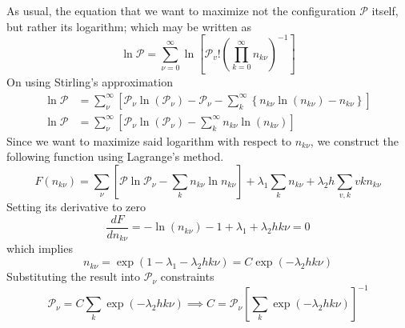 \documentclass[../../../Main.tex]{subfiles}
\begin{document}
As usual, the equation that we want to maximize not the configuration $\mathcal{P}$ itself, but rather its logarithm; which may be written as 
\begin{equation*}
    \ln \mathcal{P}=\sum_{\nu=0}^{\infty}\ln\left[\mathcal{P}_v!\left( \prod_{k=0}^{\infty} n_{k\nu}\right)^{-1}\right]
\end{equation*}
On using Stirling's approximation
\begin{align*}
    \ln \mathcal{P}&=\sum_\nu^\infty\left[\mathcal{P}_\nu\ln \left(\mathcal{P}_\nu\right)-\mathcal{P}_\nu - \sum_{k}^{\infty}\left\{n_{k\nu}\ln \left(n_{k\nu} \right)-n_{k\nu} \right\}\right]\\
    \ln \mathcal{P}&=\sum_\nu^\infty\left[\mathcal{P}_\nu\ln \left(\mathcal{P}_\nu\right) - \sum_{k}^{\infty}n_{k\nu}\ln \left(n_{k\nu} \right)\right]
\end{align*}
Since we want to maximize said logarithm with respect to $n_{k\nu}$, we construct the following function using Lagrange's method.
\begin{equation*}
    F(n_{k\nu})=\sum_\nu \left[\mathcal{P}\ln \mathcal{P}_\nu - \sum_{k} n_{k\nu}\ln n_{k\nu} \right]+ 
    \lambda_1\sum_{k}n_{k\nu}+
    \lambda_2h\sum_{v,k}vkn_{k\nu}
\end{equation*}
Setting its derivative to zero
\begin{equation*}
    \frac{dF}{dn_{k\nu}}=-\ln(n_{k\nu})-1+\lambda_1+\lambda_2hk\nu=0
\end{equation*}
which implies
\begin{equation*}
    n_{k\nu}=\exp\left(1-\lambda_1-\lambda_2hk\nu\right)=C\exp\left(-\lambda_2hk\nu\right)
\end{equation*}
Substituting the result into $\mathcal{P}_\nu$ constraints
\begin{equation*}
    \mathcal{P}_\nu=C\sum_{k } \exp\left(-\lambda_2hk\nu\right) \implies C=\mathcal{P}_\nu\left[\sum_{k } \exp\left(-\lambda_2hk\nu\right)\right]^{-1}
\end{equation*}
\end{document}
